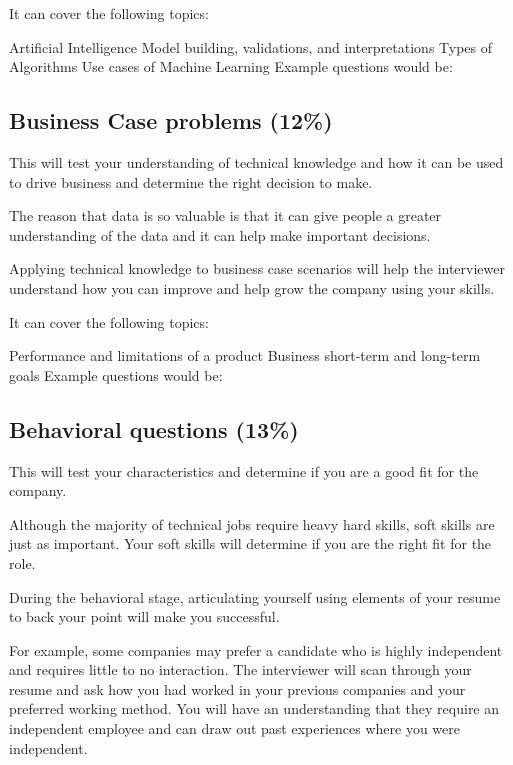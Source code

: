 \documentclass[
]{book}
\begin{document}
It can cover the following topics:

Artificial Intelligence
Model building, validations, and interpretations
Types of Algorithms
Use cases of Machine Learning
Example questions would be:

\hypertarget{business-case-problems-12}{%
\subsection{Business Case problems (12\%)}\label{business-case-problems-12}}

This will test your understanding of technical knowledge and how it can be used to drive business and determine the right decision to make.

The reason that data is so valuable is that it can give people a greater understanding of the data and it can help make important decisions.

Applying technical knowledge to business case scenarios will help the interviewer understand how you can improve and help grow the company using your skills.

It can cover the following topics:

Performance and limitations of a product
Business short-term and long-term goals
Example questions would be:

\hypertarget{behavioral-questions-13}{%
\subsection{Behavioral questions (13\%)}\label{behavioral-questions-13}}

This will test your characteristics and determine if you are a good fit for the company.

Although the majority of technical jobs require heavy hard skills, soft skills are just as important. Your soft skills will determine if you are the right fit for the role.

During the behavioral stage, articulating yourself using elements of your resume to back your point will make you successful.

For example, some companies may prefer a candidate who is highly independent and requires little to no interaction. The interviewer will scan through your resume and ask how you had worked in your previous companies and your preferred working method. You will have an understanding that they require an independent employee and can draw out past experiences where you were independent.
\end{document}

